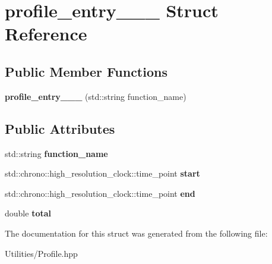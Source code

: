 \hypertarget{structprofile__entry______}{\section{profile\+\_\+entry\+\_\+\+\_\+\+\_\+ Struct Reference}
\label{structprofile__entry______}
}
\subsection*{Public Member Functions}
\begin{DoxyCompactItemize}
\item 
\hypertarget{structprofile__entry_______ab67daf5a84320a08e44d8d87139d59d6}{{\bfseries profile\+\_\+entry\+\_\+\+\_\+\+\_\+} (std\+::string function\+\_\+name)}\label{structprofile__entry_______ab67daf5a84320a08e44d8d87139d59d6}

\end{DoxyCompactItemize}
\subsection*{Public Attributes}
\begin{DoxyCompactItemize}
\item 
\hypertarget{structprofile__entry_______afe7a4c63f9bced4f5f9bd6bfa5d74557}{std\+::string {\bfseries function\+\_\+name}}\label{structprofile__entry_______afe7a4c63f9bced4f5f9bd6bfa5d74557}

\item 
\hypertarget{structprofile__entry_______a4a5554b80ae414599d61e40929d13019}{std\+::chrono\+::high\+\_\+resolution\+\_\+clock\+::time\+\_\+point {\bfseries start}}\label{structprofile__entry_______a4a5554b80ae414599d61e40929d13019}

\item 
\hypertarget{structprofile__entry_______a13e8d02839195369484346dc785298df}{std\+::chrono\+::high\+\_\+resolution\+\_\+clock\+::time\+\_\+point {\bfseries end}}\label{structprofile__entry_______a13e8d02839195369484346dc785298df}

\item 
\hypertarget{structprofile__entry_______ab2398e4192a3275b44ca28752d3cd0ef}{double {\bfseries total}}\label{structprofile__entry_______ab2398e4192a3275b44ca28752d3cd0ef}

\end{DoxyCompactItemize}


The documentation for this struct was generated from the following file\+:\begin{DoxyCompactItemize}
\item 
Utilities/Profile.\+hpp\end{DoxyCompactItemize}
